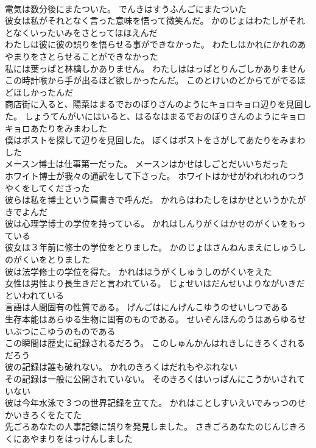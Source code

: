\documentclass[8pt]{extreport}
\begin{document}
\begin{CJK}{UTF8}{min}
\\	電気は数分後にまたついた。	でんきはすうふんごにまたついた 
\\	彼女は私がそれとなく言った意味を悟って微笑んだ。	かのじょはわたしがそれとなくいったいみをさとってほほえんだ 
\\	わたしは彼に彼の誤りを悟らせる事ができなかった。	わたしはかれにかれのあやまりをさとらせることができなかった 
\\	私には葉っぱと林檎しかありません。	わたしははっぱとりんごしかありません 
\\	この時計喉から手が出るほど欲しかったんだ。	このとけいのどからてがでるほどほしかったんだ 
\\	商店街に入ると、陽菜はまるでおのぼりさんのようにキョロキョロ辺りを見回した。	しょうてんがいにはいると、はるなはまるでおのぼりさんのようにキョロキョロあたりをみまわした 
\\	僕はポストを探して辺りを見回した。	ぼくはポストをさがしてあたりをみまわした 
\\	メースン博士は仕事第一だった。	メースンはかせはしごとだいいちだった 
\\	ホワイト博士が我々の通訳をして下さった。	ホワイトはかせがわれわれのつうやくをしてくださった 
\\	彼らは私を博士という肩書きで呼んだ。	かれらはわたしをはかせというかたがきでよんだ 
\\	彼は心理学博士の学位を持っている。	かれはしんりがくはかせのがくいをもっている 
\\	彼女は３年前に修士の学位をとりました。	かのじょはさんねんまえにしゅうしのがくいをとりました 
\\	彼は法学修士の学位を得た。	かれはほうがくしゅうしのがくいをえた 
\\	女性は男性より長生きだと言われている。	じょせいはだんせいよりながいきだといわれている 
\\	言語は人間固有の性質である。	げんごはにんげんこゆうのせいしつである 
\\	生存本能はあらゆる生物に固有のものである。	せいぞんほんのうはあらゆるせいぶつにこゆうのものである 
\\	この瞬間は歴史に記録されるだろう。	このしゅんかんはれきしにきろくされるだろう 
\\	彼の記録は誰も破れない。	かれのきろくはだれもやぶれない 
\\	その記録は一般に公開されていない。	そのきろくはいっぱんにこうかいされていない 
\\	彼は今年水泳で３つの世界記録を立てた。	かれはことしすいえいでみっつのせかいきろくをたてた 
\\	先ごろあなたの人事記録に誤りを発見しました。	さきごろあなたのじんじきろくにあやまりをはっけんしました 

\end{CJK}
\end{document}

